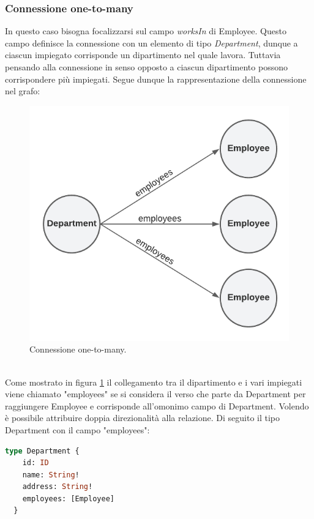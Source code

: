 \subsubsection*{Connessione one-to-many}
In questo caso bisogna focalizzarsi sul campo \textit{worksIn} di Employee. Questo campo definisce la connessione con un elemento di tipo \textit{Department}, dunque a ciascun impiegato corrisponde un dipartimento nel quale lavora. Tuttavia pensando alla connessione in senso opposto a ciascun dipartimento possono corrispondere più impiegati. Segue dunque la rappresentazione della connessione nel grafo:\\

\begin{figure}[!h]
\centering
\includegraphics[width=0.4\linewidth]{immagini/one_to_many.pdf}
\caption{Connessione one-to-many.}
\label{one-to-many}
\end{figure}
\mbox{}\\
Come mostrato in figura \ref{one-to-many} il collegamento tra il dipartimento e i vari impiegati viene chiamato "employees" se si considera il verso che parte da Department per raggiungere Employee e corrisponde all'omonimo campo di Department. Volendo è possibile attribuire doppia direzionalità alla relazione. Di seguito il tipo Department con il campo "employees":
\begin{lstlisting}[language=GraphQL,]
  type Department {
    id: ID
    name: String!
    address: String!
    employees: [Employee]
  }
\end{lstlisting}
